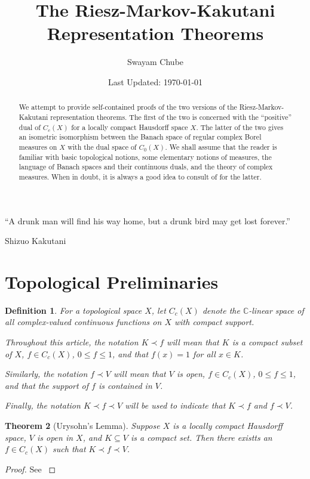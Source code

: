 \documentclass[11pt]{article}
\title{The Riesz-Markov-Kakutani Representation Theorems}
\author{Swayam Chube}
\date{Last Updated: \today}
\theoremstyle{thmstyle}
\newtheorem{theorem}{Theorem}[section]
\theoremstyle{defstyle}
\newtheorem{definition}[theorem]{Definition}
\newcommand{\bbC}{\mathbb{C}}
\renewcommand{\le}{\leqslant}
\begin{document}
\maketitle

\epigraph{``A drunk man will find his way home, but a drunk bird may get lost forever.''}{Shizuo Kakutani}

\begin{abstract}
    We attempt to provide self-contained proofs of the two versions of the Riesz-Markov-Kakutani representation theorems. The first of the two is concerned with the ``positive'' dual of $C_c(X)$ for a locally compact Hausdorff space $X$. The latter of the two gives an isometric isomorphism between the Banach space of regular complex Borel measures on $X$ with the dual space of $C_0(X)$. We shall assume that the reader is familiar with basic topological notions, some elementary notions of measures, the language of Banach spaces and their continuous duals, and the theory of complex measures. When in doubt, it is always a good idea to consult of \cite[Chaper 6]{papa-rudin} for the latter.
\end{abstract}

\section{Topological Preliminaries}

\begin{definition}
    For a topological space $X$, let $C_c(X)$ denote the $\bbC$-linear space of all complex-valued continuous functions on $X$ with compact support. 

    Throughout this article, the notation $K\prec f$ will mean that $K$ is a compact subset of $X$, $f\in C_c(X)$, $0\le f\le 1$, and that $f(x) = 1$ for all $x\in K$.

    Similarly, the notation $f\prec V$ will mean that $V$ is open, $f\in C_c(X)$, $0\le f\le 1$, and that the support of $f$ is contained in $V$.

    Finally, the notation $K\prec f\prec V$ will be used to indicate that $K\prec f$ and $f\prec V$.
\end{definition}

\begin{theorem}[Urysohn's Lemma]
    Suppose $X$ is a locally compact Hausdorff space, $V$ is open in $X$, and $K\subseteq V$ is a compact set. Then there existts an $f\in C_c(X)$ such that $K\prec f\prec V$.
\end{theorem}
\begin{proof}
    See \cite[Theorem 2.12]{papa-rudin}
\end{proof}
\end{document}

